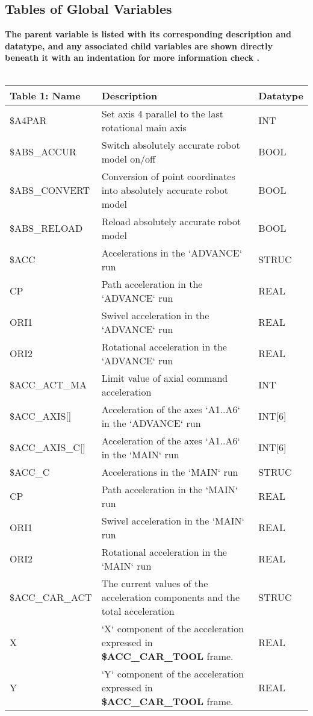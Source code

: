 \begin{appendices}
    \section{Tables of Global Variables}
    \textbf{The parent variable is listed with its corresponding description and datatype, and any associated child variables are shown directly beneath 
    it with an indentation for more information check \cite{openkuka_system_variables}.}
    \\
    \\
    \begin{tabular}{|p{}|p{}|p{}|}
        \hline
        \textbf{Table 1: Name} & \textbf{Description} & \textbf{Datatype} \\ \hline
        \$A4PAR & Set axis 4 parallel to the last rotational main axis & INT \\ \hline
        \$ABS\_ACCUR & Switch absolutely accurate robot model on/off & BOOL \\ \hline
        \$ABS\_CONVERT & Conversion of point coordinates into absolutely accurate robot model & BOOL \\ \hline
        \$ABS\_RELOAD & Reload absolutely accurate robot model & BOOL \\ \hline
        \$ACC & Accelerations in the `ADVANCE` run & STRUC \\ \hline
        \quad CP & Path acceleration in the `ADVANCE` run & REAL \\ \hline
        \quad ORI1 & Swivel acceleration in the `ADVANCE` run & REAL \\ \hline
        \quad ORI2 & Rotational acceleration in the `ADVANCE` run & REAL \\ \hline
        \$ACC\_ACT\_MA & Limit value of axial command acceleration & INT \\ \hline
        \$ACC\_AXIS[] & Acceleration of the axes `A1..A6` in the `ADVANCE` run & INT[6] \\ \hline
        \$ACC\_AXIS\_C[] & Acceleration of the axes `A1..A6` in the `MAIN` run & INT[6] \\ \hline
        \$ACC\_C & Accelerations in the `MAIN` run & STRUC \\ \hline
        \quad CP & Path acceleration in the `MAIN` run & REAL \\ \hline
        \quad ORI1 & Swivel acceleration in the `MAIN` run & REAL \\ \hline
        \quad ORI2 & Rotational acceleration in the `MAIN` run & REAL \\ \hline
        \$ACC\_CAR\_ACT & The current values of the acceleration components and the total acceleration & STRUC \\ \hline
        \quad X & `X` component of the acceleration expressed in \textbf{\$ACC\_CAR\_TOOL} frame. & REAL \\ \hline
        \quad Y & `Y` component of the acceleration expressed in \textbf{\$ACC\_CAR\_TOOL} frame. & REAL \\ \hline
        \end{tabular}
        

\end{appendices}
